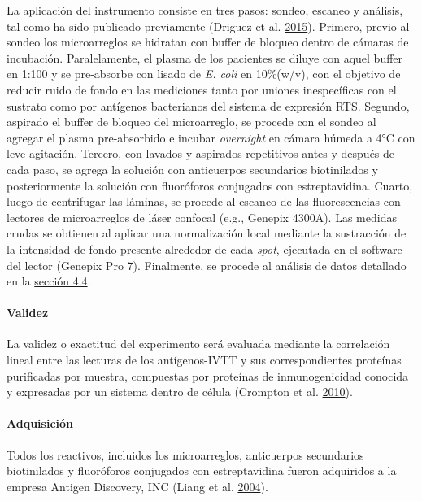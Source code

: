 \documentclass[
  a4paper]{article}
\let\oldparagraph\paragraph
\renewcommand{\paragraph}[1]{\oldparagraph{#1}\mbox{}}
\begin{document}
La aplicación del instrumento consiste en tres pasos: sondeo, escaneo y
análisis, tal como ha sido publicado previamente (Driguez et al.
\protect\hyperlink{ref-Driguez2015}{2015}). Primero, previo al sondeo
los microarreglos se hidratan con buffer de bloqueo dentro de cámaras de
incubación. Paralelamente, el plasma de los pacientes se diluye con
aquel buffer en 1:100 y se pre-absorbe con lisado de \emph{E. coli} en
10\%(w/v), con el objetivo de reducir ruido de fondo en las mediciones
tanto por uniones inespecíficas con el sustrato como por antígenos
bacterianos del sistema de expresión RTS. Segundo, aspirado el buffer de
bloqueo del microarreglo, se procede con el sondeo al agregar el plasma
pre-absorbido e incubar \emph{overnight} en cámara húmeda a 4°C con leve
agitación. Tercero, con lavados y aspirados repetitivos antes y después
de cada paso, se agrega la solución con anticuerpos secundarios
biotinilados y posteriormente la solución con fluoróforos conjugados con
estreptavidina. Cuarto, luego de centrifugar las láminas, se procede al
escaneo de las fluorescencias con lectores de microarreglos de láser
confocal (e.g., Genepix 4300A). Las medidas crudas se obtienen al
aplicar una normalización local mediante la sustracción de la intensidad
de fondo presente alrededor de cada \emph{spot}, ejecutada en el
software del lector (Genepix Pro 7). Finalmente, se procede al análisis
de datos detallado en la \protect\hyperlink{anadata}{sección 4.4}.

\hypertarget{validez}{%
\paragraph{Validez}\label{validez}}

La validez o exactitud del experimento será evaluada mediante la
correlación lineal entre las lecturas de los antígenos-IVTT y sus
correspondientes proteínas purificadas por muestra, compuestas por
proteínas de inmunogenicidad conocida y expresadas por un sistema dentro
de célula (Crompton et al. \protect\hyperlink{ref-crompton2010}{2010}).

\hypertarget{adquisiciuxf3n}{%
\paragraph{Adquisición}\label{adquisiciuxf3n}}

Todos los reactivos, incluidos los microarreglos, anticuerpos
secundarios biotinilados y fluoróforos conjugados con estreptavidina
fueron adquiridos a la empresa Antigen Discovery, INC (Liang et al.
\protect\hyperlink{ref-adiinc}{2004}).
\end{document}

